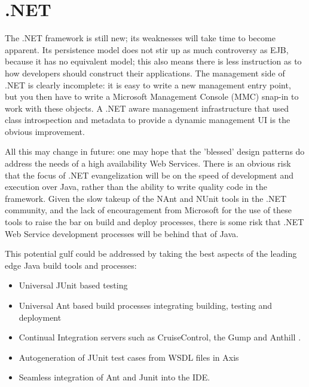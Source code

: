 \documentclass[draft]{report}
\begin{document}
\section{.NET}

The .NET framework is still new; its weaknesses will take time to become
apparent. Its persistence model does not stir up as much controversy as
EJB, because it has no equivalent model; this also means there is less
instruction as to how developers should construct their applications.
The management side of .NET is clearly incomplete: it is easy to write a
new management entry point, but you then have to write a Microsoft
Management Console (MMC) snap-in to work with these objects. A .NET
aware management infrastructure that used class introspection and
metadata to provide a dynamic management UI is the obvious improvement.

All this may change in future: one may hope that the 'blessed' design
patterns do address the needs of a high availability Web Services. There
is an obvious risk that the focus of .NET evangelization will be on the
speed of development and execution over Java, rather than the ability to
write quality code in the framework. Given the slow takeup of the NAnt
and NUnit tools in the .NET community, and the lack of encouragement
from Microsoft for the use of these tools to raise the bar on build and
deploy processes, there is some risk that .NET Web Service development
processes will be behind that of Java.

This potential gulf could be addressed by taking the best aspects of the
leading edge Java build tools and processes:

\begin{itemize} \item Universal JUnit based testing

\item Universal Ant based build processes integrating building, testing
and deployment

\item Continual Integration servers such as CruiseControl, the Gump and
Anthill \cite{fowler:cruisecontrol,ruby:gump,app:anthill}.

\item Autogeneration of JUnit test cases from WSDL files in Axis
\cite{apache:axis,loughran:antbook}

\item Seamless integration of Ant and Junit into the IDE. \end{itemize}
\end{document}
